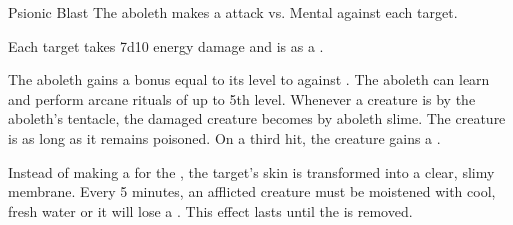     \begin{freeability}{Psionic Blast}
       The aboleth makes a  attack
        vs. Mental against each target.
    
    \hit Each target takes 7d10 energy damage and is  as a .
    \end{freeability}
  
       The aboleth gains a bonus equal to its level to  against .
     The aboleth can learn and perform arcane rituals of up to 5th level.
        Whenever a creature is  by the aboleth's tentacle,
          the damaged creature becomes  by aboleth slime.
        The creature is  as long as it remains poisoned.
        On a third hit, the creature gains a .

        Instead of making a  for the ,
          the target's skin is transformed into a clear, slimy membrane.
        Every 5 minutes, an afflicted creature must be moistened with cool, fresh water
          or it will lose a .
        This effect lasts until the  is removed.
  
